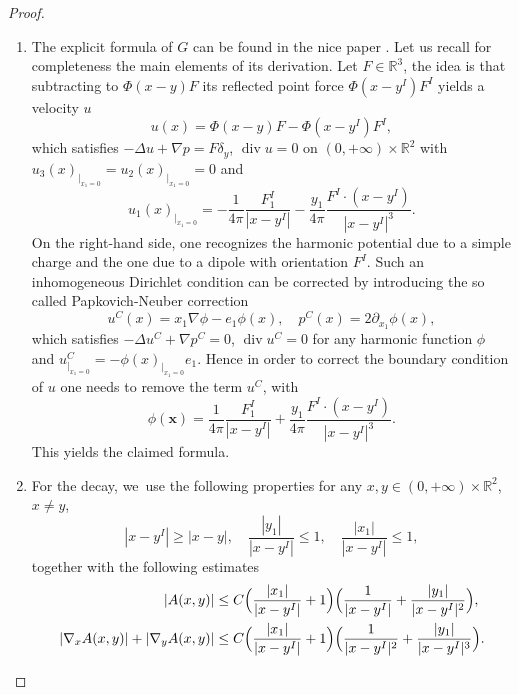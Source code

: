 \documentclass[JEP,XML,SOM,Unicode,NoEqCountersInSection,published]{cedram}
\renewcommand{\div}{\operatorname{div}}
\theoremstyle{plain}
\theoremstyle{definition}
\newcommand{\R}{\mathbb{R}}
\begin{document}
\skpt
\begin{proof}
\begin{enumerate}
\item The explicit formula of $G$ can be found in the nice paper \cite[Formula (21)]{Gimbutas_Greengard_Veerapaneni_2015}. Let us recall for completeness the main elements of its derivation. Let $F\in \R^3$, the idea is that subtracting to $\Phi(x-y)F$ its reflected point force $\Phi(x-y^I)F^I$ yields a velocity $u$
\[
u(x)=\Phi(x-y)F-\Phi(x-y^I)F^I,
\]
which satisfies $-\Delta u +\nabla p=F \delta_y$, $\div u=0$ on $(0,+\infty)\times\R^2$ with $u_3(x)_{|_{x_1=0}}=u_2(x)_{|_{x_1=0}}=0$ and
\[
u_1(x)_{|_{x_1=0}}=- \frac{1}{4\pi}\frac{F_1^I}{|x-y^I|}-\frac{y_1}{4\pi} \frac{F^I \cdot (x-y^I)}{|x-y^I|^3}.
\]
On the right-hand side, one recognizes the harmonic potential due to a simple charge and the one due to a dipole with orientation $F^I$.
Such an inhomogeneous Dirichlet condition can be corrected by introducing the so called Papkovich-Neuber correction \cite[Def.\,2.1]{Gimbutas_Greengard_Veerapaneni_2015}
\[
u^C(x)=x_1 \nabla \phi-e_1 \phi(x), \quad p^C(x)=2\partial_{x_1}\phi(x),
\]
which satisfies $-\Delta u^C+\nabla p^C =0$, $\div u^C=0$ for any harmonic function $\phi$ and $u^C_{|_{x_1=0}}=-\phi(x)_{|_{x_1=0}}e_1$. Hence in order to correct the boundary condition of $u$ one needs to remove the term $u^C$, with
\[
\phi(\mathbf{x})=\frac{1}{4\pi}\frac{F_1^I}{|x-y^I|}+\frac{y_1}{4\pi} \frac{F^I \cdot (x-y^I)}{|x-y^I|^3}.
\]
This yields the claimed formula.
\item For the decay, we~use the following properties for any $x, y \in (0,+\infty)\times \R^2 $, $x\neq y$,
\[
|x-y^I|\geq |x-y|, \quad \frac{|y_1|}{|x-y^I|} \leq 1, \quad \frac{|x_1|}{|x-y^I|} \leq 1,
\]
together with the following estimates
\begin{align*}
|A(x,y)| &\leq C \Bigl(\frac{|x_1|}{|x-y^I|}+ 1 \Bigr) \Bigl(\frac{1}{|x-y^I|}+ \frac{|y_1|}{|x-y^I|^2} \Bigr),
\\
|\nabla_x A(x,y)|+|\nabla_y A(x,y)| &\leq C \Bigl(\frac{|x_1|}{|x-y^I|}+ 1 \Bigr) \Bigl(\frac{1}{|x-y^I|^2}+ \frac{|y_1|}{|x-y^I|^3} \Bigr).\qedhere
\end{align*}
\end{enumerate}
\end{proof}




\end{document}
